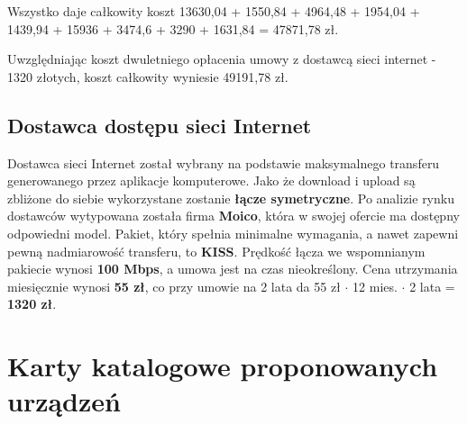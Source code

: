 \documentclass[a4paper, 12pt]{article}
\begin{document}
Wszystko daje całkowity koszt 13630,04 + 1550,84 + 4964,48 + 1954,04 + 1439,94 + 
15936 + 3474,6 + 3290 + 1631,84 = 47871,78 zł.

Uwzględniając koszt dwuletniego opłacenia umowy z dostawcą sieci internet - 1320 złotych, koszt całkowity wyniesie 49191,78 zł.

\subsection*{Dostawca dostępu sieci Internet}
\indent Dostawca sieci Internet został wybrany na podstawie maksymalnego transferu generowanego przez aplikacje komputerowe. Jako że download i upload są zbliżone do siebie wykorzystane zostanie \textbf{łącze symetryczne}.
\newline \indent Po analizie rynku dostawców wytypowana została firma \textbf{Moico}, która w swojej ofercie ma dostępny odpowiedni model. Pakiet, który spełnia minimalne wymagania, a nawet zapewni pewną nadmiarowość transferu, to \textbf{KISS}. Prędkość łącza we wspomnianym pakiecie wynosi \textbf{100 Mbps}, a umowa jest na czas nieokreślony. Cena utrzymania miesięcznie wynosi \textbf{55 zł}, co przy umowie na 2 lata da 55 zł $\cdot$ 12 mies. $\cdot$ 2 lata = \textbf{1320 zł}.    


\section{Karty katalogowe proponowanych urządzeń}
\end{document}
